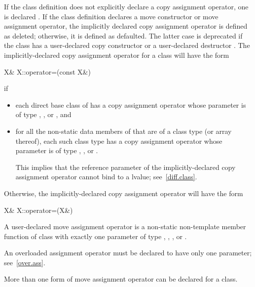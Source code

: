 \pnum
If the class definition does not explicitly declare a copy assignment operator,
one is declared .
If the class definition declares a move
constructor or move assignment operator, the implicitly declared copy
assignment operator is defined as deleted; otherwise, it is defined as
defaulted.
The latter case is deprecated if the class has a user-declared copy constructor
or a user-declared destructor .
The implicitly-declared copy assignment operator for a class
will have the form
\begin{codeblock}
X& X::operator=(const X&)
\end{codeblock}
if
\begin{itemize}
\item
each direct base class  of 
has a copy assignment operator whose parameter is of type
, , or , and
\item
for all the non-static data members of 
that are of a class type  (or array thereof),
each such class type has a copy assignment operator whose parameter is of type
, ,
or .
\begin{footnote}
This implies that the reference parameter of the
implicitly-declared copy assignment operator cannot bind to a
 lvalue; see~\ref{diff.class}.
\end{footnote}
\end{itemize}

Otherwise, the implicitly-declared copy assignment operator
will have the form
\begin{codeblock}
X& X::operator=(X&)
\end{codeblock}

\pnum
A user-declared move assignment operator  is
a non-static non-template member function of class  with exactly
one parameter of type , , , or
.
\begin{note}
An overloaded assignment operator must be
declared to have only one parameter; see~\ref{over.ass}.
\end{note}
{}
\begin{note}
More than one form of move assignment operator can be declared for a class.
\end{note}

